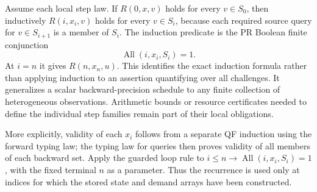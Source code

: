 Assume each local step law.  If $R(0,x,v)$ holds for every $v\in S_0$, then
inductively $R(i,x_i,v)$ holds for every $v\in S_i$, because each required
source query for $v\in S_{i+1}$ is a member of $S_i$.  The induction predicate
is the PR Boolean finite conjunction
\[
 \operatorname{All}(i,x_i,S_i)=1.
\]
At $i=n$ it gives $R(n,x_n,u)$.  This identifies the exact induction formula
rather than applying induction to an assertion quantifying over all
challenges.  It generalizes a scalar backward-precision schedule to any finite
collection of heterogeneous observations.  Arithmetic bounds or resource
certificates needed to define the individual step families remain part of
their local obligations.

More explicitly, validity of each $x_i$ follows from a separate QF induction
using the forward typing law; the typing law for queries then proves validity
of all members of each backward set. Apply the guarded loop rule to
$i\le n\to\operatorname{All}(i,x_i,S_i)=1$, with the fixed terminal $n$
as a parameter. Thus the recurrence is used only at indices for which the
stored state and demand arrays have been constructed.
